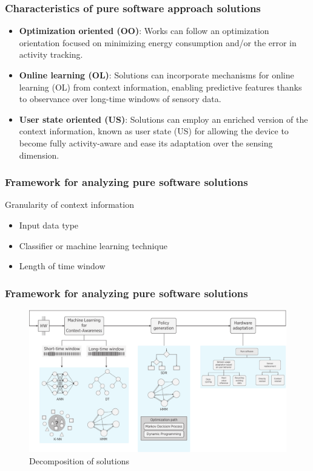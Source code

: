 \documentclass[compress,9pt,xcolor={dvipsnames,table}]{beamer}
\begin{document}
\begin{frame}[t]\frametitle{Characteristics of pure software approach solutions}
\begin{tcolorbox}[title=Distinctive characteristics of pure software solutions,colframe=PineGreen]
\small
\begin{itemize}
  \item \textbf{Optimization oriented (OO)}: Works can follow an optimization orientation focused on minimizing energy consumption and/or the error in activity tracking.
  \item \textbf{Online learning (OL)}: Solutions can incorporate mechanisms for online learning (OL) from context information, enabling predictive features thanks to observance over long-time windows of sensory data.
  \item \textbf{User state oriented (US)}: Solutions can employ an enriched version of the context information, known as user state (US) for allowing the device to become fully activity-aware and ease its adaptation over the sensing dimension.
\end{itemize}
\end{tcolorbox}
\end{frame}

\begin{frame}[t]\frametitle{Framework for analyzing pure software solutions}
\begin{tcolorbox}[title=Framework for analyzing pure software solutions,colframe=PineGreen]
\small
Granularity of context information
\begin{itemize}
  \item Input data type
  \item Classifier or machine learning technique
  \item Length of time window
\end{itemize}
\end{tcolorbox}
\end{frame}


\begin{frame}[t]\frametitle{Framework for analyzing pure software solutions}
\begin{figure}[tb]
  \centering
  \includegraphics[width=\textwidth]{../../../resources/images/vectors/dual-taxonomy}
  \caption{Decomposition of solutions}
  \label{fig:dual-taxonomy}
  \end{figure}
\end{frame}
\end{document}
